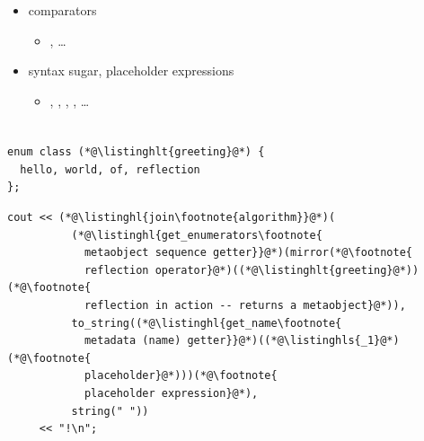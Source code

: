 \documentclass[compress,table,xcolor=table]{beamer}
\begin{document}
\begin{frame}[fragile]
\begin{columns}
\begin{column}{.50\textwidth}
\begin{itemize}
\begin{itemize}
          \end{itemize}
        \item comparators
          \begin{itemize}
            \smaller
            \item {}, \ldots
          \end{itemize}
        \item syntax sugar, placeholder expressions
          \begin{itemize}
            \smaller
            \item {}, ,
              , ,
              \ldots
          \end{itemize}
      \end{itemize}
    \end{column}
  \end{columns}
\end{frame}
\begin{frame}[fragile]
  \frametitle{}
  \begin{lstlisting}[language=c++2x,basicstyle=\normalsize\ttfamily]
enum class (*@\listinghlt{greeting}@*) {
  hello, world, of, reflection
};
  \end{lstlisting}
  \begin{lstlisting}[language=c++2x,basicstyle=\normalsize\ttfamily]
cout << (*@\listinghl{join\footnote{algorithm}}@*)(
          (*@\listinghl{get_enumerators\footnote{
            metaobject sequence getter}}@*)(mirror(*@\footnote{
            reflection operator}@*)((*@\listinghlt{greeting}@*))(*@\footnote{
            reflection in action -- returns a metaobject}@*)),
          to_string((*@\listinghl{get_name\footnote{
            metadata (name) getter}}@*)((*@\listinghls{_1}@*)(*@\footnote{
            placeholder}@*)))(*@\footnote{
            placeholder expression}@*),
          string(" "))
     << "!\n";
  \end{lstlisting}
\end{frame}
\end{document}
